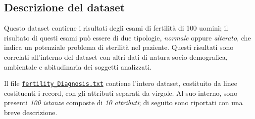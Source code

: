 
\subsection{Descrizione del dataset}\label{subsec:intro:dataset}

Questo dataset contiene i risultati degli esami di fertilità di 100 uomini;
il risultato di questi esami può essere di due tipologie, \emph{normale} oppure \emph{alterato}, che indica un potenziale problema di sterilità nel paziente.
Questi risultati sono correlati all'interno del dataset con altri dati di natura socio-demografica, ambientale e abitudinaria dei soggetti analizzati.

Il file \href{http://archive.ics.uci.edu/ml/machine-learning-databases/00244/fertility_Diagnosis.txt}{\texttt{fertility\_Diagnosis.txt}}
contiene l'intero dataset, costituito da linee costituenti i record, con gli attributi separati da virgole.
Al suo interno, sono presenti \emph{100 istanze} composte di \emph{10 attributi};
di seguito sono riportati con una breve descrizione.


